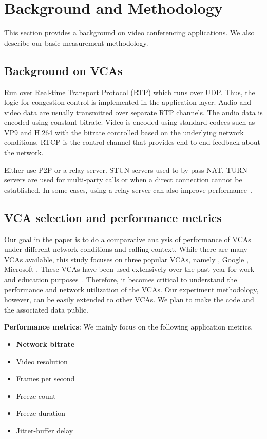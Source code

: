 \section{Background and Methodology}
\label{sec:background}
This section provides a background on video conferencing applications. We also describe our basic measurement methodology.

\subsection{Background on VCAs}
Run over Real-time Transport Protocol (RTP) which runs over UDP. Thus, the logic for congestion control is implemented in the application-layer. Audio and video data are usually transmitted over separate RTP channels. The audio data is encoded using constant-bitrate. Video is encoded using standard codecs such as VP9 and H.264 with the bitrate controlled based on the underlying network conditions. RTCP is the control channel that provides end-to-end feedback about the network. 

Either use P2P or a relay server. STUN servers used to by pass NAT. TURN servers are used for multi-party calls or when a direct connection cannot be established. In some cases, using a relay server can also improve performance~\cite{via}. 



\subsection{VCA selection and performance metrics}
Our goal in the paper is to do a comparative analysis of performance of VCAs under different network conditions and calling context. While there are many VCAs available, this study focuses on three popular VCAs, namely \zoom, Google \meet, Microsoft \teams. These VCAs have been used extensively over the past year for work and education purposes~\cite{}. Therefore, it becomes critical to understand the performance and network utilization of the VCAs. Our experiment methodology, however, can be easily extended to other VCAs. We plan to make the code and the associated data public. 



\textbf{Performance metrics}: We mainly focus on the following application metrics. 
\begin{itemize}
    \item \textbf{Network bitrate}
    \item Video resolution
    \item Frames per second
    \item Freeze count
    \item Freeze duration
    \item Jitter-buffer delay 
\end{itemize}

